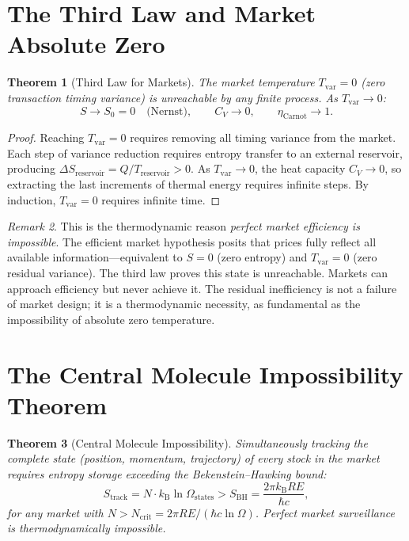 \documentclass[twocolumn,10pt]{article}
\newtheorem{theorem}{Theorem}[section]
\theoremstyle{remark}
\newtheorem{remark}[theorem]{Remark}
\newcommand{\kB}{k_{\mathrm{B}}}
\newcommand{\Tvar}{T_{\mathrm{var}}}
\begin{document}
\section{The Third Law and Market Absolute Zero}
\label{sec:third_law}

\begin{theorem}[Third Law for Markets]
\label{thm:third_law}
The market temperature $\Tvar = 0$ (zero transaction timing variance) is unreachable by any finite process.  As $\Tvar \to 0$:
\begin{equation}
    S \to S_0 = 0 \quad \text{(Nernst)}, \qquad C_V \to 0, \qquad \eta_{\mathrm{Carnot}} \to 1.
    \label{eq:third_law}
\end{equation}
\end{theorem}

\begin{proof}
Reaching $\Tvar = 0$ requires removing all timing variance from the market.  Each step of variance reduction requires entropy transfer to an external reservoir, producing $\Delta S_{\mathrm{reservoir}} = Q/T_{\mathrm{reservoir}} > 0$.  As $\Tvar \to 0$, the heat capacity $C_V \to 0$, so extracting the last increments of thermal energy requires infinite steps.  By induction, $\Tvar = 0$ requires infinite time.
\end{proof}

\begin{remark}
This is the thermodynamic reason \emph{perfect market efficiency is impossible}.  The efficient market hypothesis \cite{fama1970} posits that prices fully reflect all available information---equivalent to $S = 0$ (zero entropy) and $\Tvar = 0$ (zero residual variance).  The third law proves this state is unreachable.  Markets can approach efficiency but never achieve it.  The residual inefficiency is not a failure of market design; it is a thermodynamic necessity, as fundamental as the impossibility of absolute zero temperature.
\end{remark}

\section{The Central Molecule Impossibility Theorem}
\label{sec:impossibility}

\begin{theorem}[Central Molecule Impossibility]
\label{thm:impossibility}
Simultaneously tracking the complete state (position, momentum, trajectory) of every stock in the market requires entropy storage exceeding the Bekenstein--Hawking bound:
\begin{equation}
    S_{\mathrm{track}} = N \cdot \kB \ln \Omega_{\mathrm{states}} > S_{\mathrm{BH}} = \frac{2\pi \kB R E}{\hbar c},
    \label{eq:impossibility}
\end{equation}
for any market with $N > N_{\mathrm{crit}} = 2\pi R E / (\hbar c \ln \Omega)$.  Perfect market surveillance is thermodynamically impossible.
\end{theorem}
\end{document}

